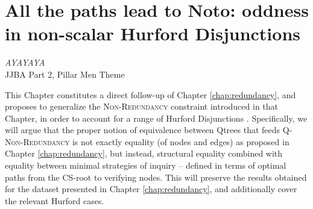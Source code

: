 \chapter[All the paths lead to Noto: oddness in non-scalar Hurford Disjunctions]{All the paths lead to Noto: oddness in non-scalar Hurford Disjunctions\footnotemark}\label{chap:hurford-disj}

\begin{flushright}
	\textit{AYAYAYA}\\\vspace{2mm}
	JJBA Part 2, Pillar Men Theme
\end{flushright}

This Chapter constitutes a direct follow-up of Chapter \ref{chap:redundancy}, and proposes to generalize the \textsc{Non-Redundancy} constraint introduced in that Chapter, in order to account for a range of Hurford Disjunctions \parencite{Hurford1974,Marty2022}. Specifically, we will argue that the proper notion of equivalence between Qtrees that feeds \textsc{Q-Non-Redundancy} is not exactly equality (of nodes and edges) as proposed in Chapter \ref{chap:redundancy}, but instead, structural equality combined with equality between minimal strategies of inquiry -- defined in terms of optimal paths from the CS-root to verifying nodes. This will preserve the results obtained for the dataset presented in Chapter \ref{chap:redundancy}, and additionally cover the relevant Hurford cases.

